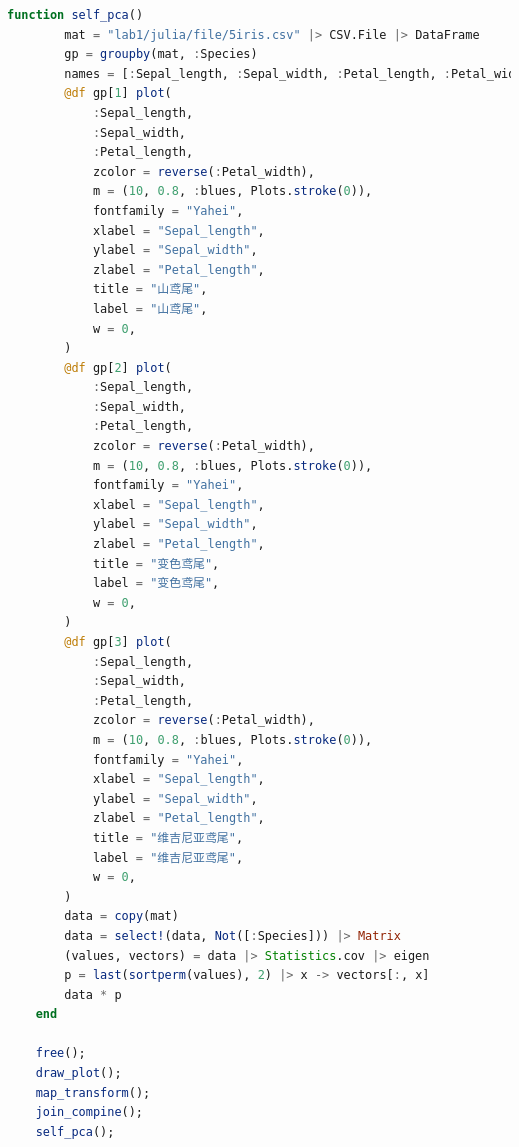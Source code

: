 \documentclass[a4paper]{article}
\begin{document}
\begin{lstlisting}[language=julia]
    function self_pca()
        mat = "lab1/julia/file/5iris.csv" |> CSV.File |> DataFrame
        gp = groupby(mat, :Species)
        names = [:Sepal_length, :Sepal_width, :Petal_length, :Petal_width, :Species]
        @df gp[1] plot(
            :Sepal_length,
            :Sepal_width,
            :Petal_length,
            zcolor = reverse(:Petal_width),
            m = (10, 0.8, :blues, Plots.stroke(0)),
            fontfamily = "Yahei",
            xlabel = "Sepal_length",
            ylabel = "Sepal_width",
            zlabel = "Petal_length",
            title = "山鸢尾",
            label = "山鸢尾",
            w = 0,
        )
        @df gp[2] plot(
            :Sepal_length,
            :Sepal_width,
            :Petal_length,
            zcolor = reverse(:Petal_width),
            m = (10, 0.8, :blues, Plots.stroke(0)),
            fontfamily = "Yahei",
            xlabel = "Sepal_length",
            ylabel = "Sepal_width",
            zlabel = "Petal_length",
            title = "变色鸢尾",
            label = "变色鸢尾",
            w = 0,
        )
        @df gp[3] plot(
            :Sepal_length,
            :Sepal_width,
            :Petal_length,
            zcolor = reverse(:Petal_width),
            m = (10, 0.8, :blues, Plots.stroke(0)),
            fontfamily = "Yahei",
            xlabel = "Sepal_length",
            ylabel = "Sepal_width",
            zlabel = "Petal_length",
            title = "维吉尼亚鸢尾",
            label = "维吉尼亚鸢尾",
            w = 0,
        )
        data = copy(mat)
        data = select!(data, Not([:Species])) |> Matrix 
        (values, vectors) = data |> Statistics.cov |> eigen
        p = last(sortperm(values), 2) |> x -> vectors[:, x]
        data * p
    end
    
    free();
    draw_plot();
    map_transform();
    join_compine();
    self_pca();
    
\end{lstlisting}
\end{document}
